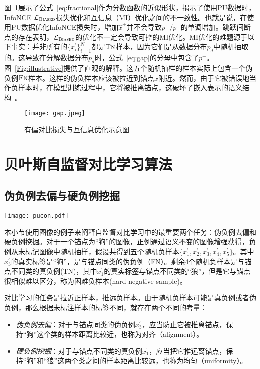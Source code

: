图~\ref{Fig:gap}展示了公式~\eqref{eq:fractional}作为分数函数的近似形状，揭示了使用PU数据时，InfoNCE $\mathcal{L}_\textsc{Biased}$损失优化和互信息（MI）优化之间的不一致性。也就是说，在使用PU数据优化InfoNCE损失时，增加$\hat{x}^+$并不会导致$p^+/p^-$的单调增加。跳跃间断点的存在表明，$\mathcal{L}_\textsc{Biased}$的优化不一定会导致可控的MI优化。MI优化的难题源于以下事实：并非所有的$\{x_i^\prime\}_{i=1}^N$都是$\textsc{Tn}$样本，因为它们是从数据分布$ p_d $中随机抽取的。这导致在分解数据分布$ p_d $时，公式~\eqref{eq:gap}的分母中包含了$ p^+$。图~\ref{Fig:illustrative}提供了直观的解释。这五个随机抽样的样本实际上包含一个伪负例$\textsc{Fn}$样本。这样的伪负样本应该被拉近到锚点$x$附近。然而，由于它被错误地当作负样本时，在模型训练过程中，它将被推离锚点，这破坏了嵌入表示的语义结构~\cite{Feng:2021:CVPR}。
\begin{figure}[!]
	\centering
	\texttt{[image: gap.jpeg]}
	\caption{有偏对比损失与互信息优化示意图}
	\label{Fig:gap}
\end{figure}


\section{贝叶斯自监督对比学习算法}
\subsection{伪负例去偏与硬负例挖掘}\label{subsec:fh}
\begin{figure*}[!]
	\centering
	\texttt{[image: pucon.pdf]}
	\caption{自监督对比学习的伪负例去偏和硬负例挖掘示意图}
	\label{Fig:illustrative}
\end{figure*}
本小节使用图像的例子来阐释自监督对比学习中的最重要两个任务：伪负例去偏和硬负例挖掘。对于一个锚点为“狗”的图像，正例通过语义不变的图像增强获得，负例从未标记图像中随机抽样，假设共得到五个随机负样本$\{x_1^\prime,x_2^\prime,x_3^\prime,x_4^\prime,x_5^\prime\}$。其中$x_3^\prime$的真实标签是“狗”，是与锚点同类的伪负例（FN）。剩余4个随机负样本是与锚点不同类的真负例(TN)，其中$x_1^\prime$的真实标签与锚点不同类的“狼”，但是它与锚点很相似难以区分，称为困难负样本(hard negative sample)。

对比学习的任务是拉近正样本，推远负样本。由于随机负样本可能是真负例或者伪负例，那么根据未标注样本的标签不同，就存在两个不同的考量：
\begin{itemize}
\item \textit{伪负例去偏}：对于与锚点同类的伪负例$x_3^\prime$，应当防止它被推离锚点，保持“狗”这个类的样本距离比较近，也称为对齐（alignment）。
\item \textit{硬负例挖掘}：对于与锚点不同类的真负例$x_1^\prime$，应当把它推远离锚点，保持“狗”和“狼”这两个类之间的样本距离比较远，也称为均匀（uniformity）。
\end{itemize}

